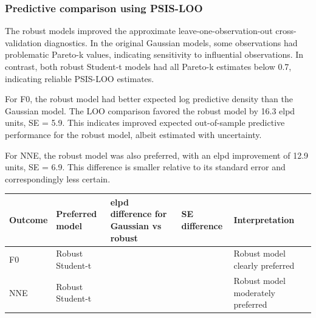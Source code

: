 \documentclass[
  english,
  man,floatsintext]{apa6}
\newcounter{none} %
\begin{document}
\subsubsection{Predictive comparison using PSIS-LOO}\label{predictive-comparison-using-psis-loo}

The robust models improved the approximate leave-one-observation-out cross-validation diagnostics. In the original Gaussian models, some observations had problematic Pareto-k values, indicating sensitivity to influential observations. In contrast, both robust Student-t models had all Pareto-k estimates below 0.7, indicating reliable PSIS-LOO estimates.

For F0, the robust model had better expected log predictive density than the Gaussian model. The LOO comparison favored the robust model by 16.3 elpd units, SE = 5.9. This indicates improved expected out-of-sample predictive performance for the robust model, albeit estimated with uncertainty.

For NNE, the robust model was also preferred, with an elpd improvement of 12.9 units, SE = 6.9. This difference is smaller relative to its standard error and correspondingly less certain.

{\def\LTcaptype{none} %
\begin{longtable}[]{@{}
  >{\raggedright\arraybackslash}p{}
  >{\raggedright\arraybackslash}p{}
  >{\raggedleft\arraybackslash}p{}
  >{\raggedleft\arraybackslash}p{}
  >{\raggedright\arraybackslash}p{}@{}}
\toprule\noalign{}
\begin{minipage}[b]{\linewidth}\raggedright
Outcome
\end{minipage} & \begin{minipage}[b]{\linewidth}\raggedright
Preferred model
\end{minipage} & \begin{minipage}[b]{\linewidth}\raggedleft
elpd difference for Gaussian vs robust
\end{minipage} & \begin{minipage}[b]{\linewidth}\raggedleft
SE difference
\end{minipage} & \begin{minipage}[b]{\linewidth}\raggedright
Interpretation
\end{minipage} \\
\midrule\noalign{}
\endhead
\bottomrule\noalign{}
\endlastfoot
F0 & Robust Student-t & -16.3 & 5.9 & Robust model clearly preferred \\
NNE & Robust Student-t & -12.9 & 6.9 & Robust model moderately preferred \\
\end{longtable}
}
\end{document}
